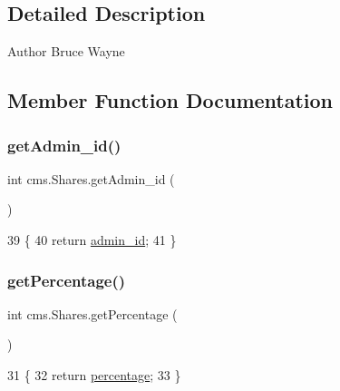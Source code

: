 \subsection{Detailed Description}
\begin{DoxyAuthor}{Author}
Bruce Wayne 
\end{DoxyAuthor}


\subsection{Member Function Documentation}
\mbox{\label{classcms_1_1_shares_a544a337f6d85a1e91f719678bd050763}} 
\subsubsection{\texorpdfstring{get\+Admin\+\_\+id()}{getAdmin\_id()}}
{\footnotesize\ttfamily int cms.\+Shares.\+get\+Admin\+\_\+id (\begin{DoxyParamCaption}{ }\end{DoxyParamCaption})\hspace{0.3cm}{\ttfamily [inline]}}


\begin{DoxyCode}
39                              \{
40         \textcolor{keywordflow}{return} \mbox{\hyperlink{classcms_1_1_shares_a04c23ccc0ceb9f01dad2e5cb65cbc7e6}{admin\_id}};
41     \}
\end{DoxyCode}
\mbox{\label{classcms_1_1_shares_af7f36074ebe66a289b66ad57cb96b0bf}} 
\subsubsection{\texorpdfstring{get\+Percentage()}{getPercentage()}}
{\footnotesize\ttfamily int cms.\+Shares.\+get\+Percentage (\begin{DoxyParamCaption}{ }\end{DoxyParamCaption})\hspace{0.3cm}{\ttfamily [inline]}}


\begin{DoxyCode}
31                                \{
32         \textcolor{keywordflow}{return} \mbox{\hyperlink{classcms_1_1_shares_a7235d21d3198a5acbd0135d6486e6f51}{percentage}};
33     \}
\end{DoxyCode}
\mbox{\label{classcms_1_1_shares_a2606dd07a0591e0ded437516a27c81b6}} 
